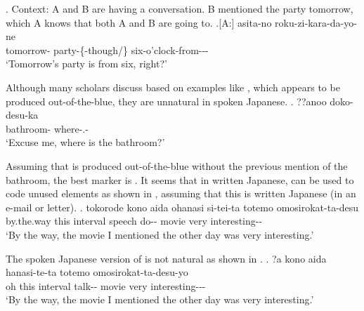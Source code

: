 %
\ex. Context: A and B are having a conversation. B mentioned the party tomorrow, which A knows that both A and B are going to.
	\ag.[A:] asita-no  roku-zi-kara-da-yo-ne \\
		tomorrow- party-\{-though/\} six-o'clock-from--\ab{fp}- \\
		`Tomorrow's party is from six, right?' 


Although many scholars discuss  based on examples like \Next,
which appears to be produced out-of-the-blue,
they are unnatural in spoken Japanese.
%
\exg. ??anoo  doko-desu-ka \\
	 bathroom- where-.- \\
	`Excuse me, where is the bathroom?'

Assuming that \Last is produced out-of-the-blue without the previous mention of the bathroom,
the best marker is \ci{\O}.
It seems that in written Japanese,
 can be used to code unused elements as shown in \Next,
assuming that this is written Japanese (in an e-mail or letter).
%
\exg. tokorode kono aida ohanasi si-tei-ta  totemo omosirokat-ta-desu \\
	by.the.way this interval speech do-- movie
 very interesting-- \\
 `By the way, the movie I mentioned the other day was very interesting.'

The spoken Japanese version of \Last is not natural as shown in \Next.
%
\exg. ?a kono aida hanasi-te-ta  totemo omosirokat-ta-desu-yo \\
	oh this interval talk-- movie
 very interesting--- \\
 `By the way, the movie I mentioned the other day was very interesting.'

